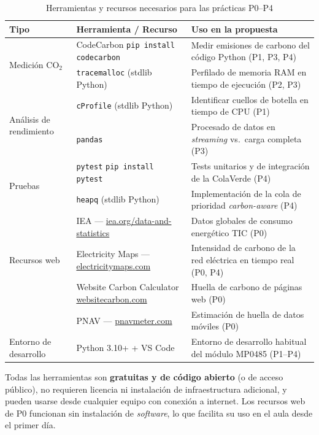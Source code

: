 \begin{table}[H]
\centering
\caption{Herramientas y recursos necesarios para las prácticas P0–P4}
\label{tab:herramientas}
\renewcommand{\arraystretch}{1.3}
\begin{tabular}{@{}p{3cm}p{4.5cm}p{6.5cm}@{}}
\toprule
\textbf{Tipo} & \textbf{Herramienta / Recurso} & \textbf{Uso en la propuesta} \\
\midrule
\multirow{2}{*}{Medición CO$_2$}
  & CodeCarbon \newline \texttt{pip install codecarbon}
  & Medir emisiones de carbono del código Python (P1, P3, P4) \\
  & \texttt{tracemalloc} (stdlib Python)
  & Perfilado de memoria RAM en tiempo de ejecución (P2, P3) \\
\midrule
\multirow{2}{2.8cm}{\raggedright Análisis de rendimiento}
  & \texttt{cProfile} (stdlib Python)
  & Identificar cuellos de botella en tiempo de CPU (P1) \\
  & \texttt{pandas}
  & Procesado de datos en \textit{streaming} vs.\ carga completa (P3) \\
\midrule
\multirow{2}{*}{Pruebas}
  & \texttt{pytest} \newline \texttt{pip install pytest}
  & Tests unitarios y de integración de la ColaVerde (P4) \\
  & \texttt{heapq} (stdlib Python)
  & Implementación de la cola de prioridad \textit{carbon-aware} (P4) \\
\midrule
\multirow{3}{*}{Recursos web}
  & IEA — \url{iea.org/data-and-statistics}
  & Datos globales de consumo energético TIC (P0) \\
  & Electricity Maps — \url{electricitymaps.com}
  & Intensidad de carbono de la red eléctrica en tiempo real (P0, P4) \\
  & Website Carbon Calculator \newline \url{websitecarbon.com}
  & Huella de carbono de páginas web (P0) \\
  & PNAV — \url{pnavmeter.com}
  & Estimación de huella de datos móviles (P0) \\
\midrule
Entorno de desarrollo
  & Python 3.10+ + VS Code
  & Entorno de desarrollo habitual del módulo MP0485 (P1–P4) \\
\bottomrule
\end{tabular}
\end{table}

Todas las herramientas son \textbf{gratuitas y de código abierto} (o de acceso público), no requieren licencia ni instalación de infraestructura adicional, y pueden usarse desde cualquier equipo con conexión a internet. Los recursos web de P0 funcionan sin instalación de \textit{software}, lo que facilita su uso en el aula desde el primer día.



